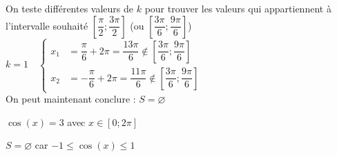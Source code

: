 \documentclass[11pt,a4paper]{article}  %
\begin{document}
\begin{enumMet}
\begin{enumMet}
\begin{corrBox}
					On teste différentes valeurs de $k$ pour trouver les valeurs qui appartiennent à l'intervalle souhaité $\left[\dfrac{\pi}{2} ; \dfrac{3 \pi}{2}\right]$ (ou $\left[\dfrac{3\pi}{6};\dfrac{9\pi}{6}\right]$)\\
					$k=1\quad \begin{cases}
						x_1 &=\dfrac{\pi}{6}+2\pi=\dfrac{13\pi}{6}\notin\left[\dfrac{3\pi}{6};\dfrac{9\pi}{6}\right]\\
						x_2 &=-\dfrac{\pi}{6}+2\pi=\dfrac{11\pi}{6}\notin\left[\dfrac{3\pi}{6};\dfrac{9\pi}{6}\right]
					\end{cases}$\\
					On peut maintenant conclure : $S=\varnothing$	
				\end{corrBox}
			\end{enumMet}
		\item $\cos (x)=3$ avec $x \in[0 ; 2 \pi]$
		\begin{corrBox}
			$S=\varnothing$ car $-1\leqslant\cos(x)\leqslant1$	
		\end{corrBox}
	\end{enumMet}
\end{document}
